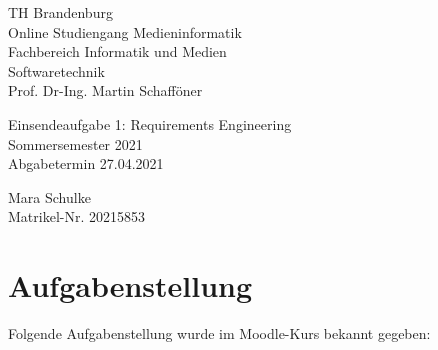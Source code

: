 \documentclass{article}
\begin{document}
\begin{titlepage}
	\begin{flushleft}
		TH Brandenburg \\
		Online Studiengang Medieninformatik \\
		Fachbereich Informatik und Medien \\
		Softwaretechnik \\
		Prof. Dr-Ing. Martin Schafföner
	\end{flushleft}

	\vfill

	\begin{center}
		\Large{Einsendeaufgabe 1: Requirements Engineering}\\[0.5em]
		\large{Sommersemester 2021}\\[0.25em]
		\large{Abgabetermin 27.04.2021}
	\end{center}

	\vfill

	\begin{flushright}
		Mara Schulke \\
		Matrikel-Nr. 20215853
	\end{flushright}
\end{titlepage}

\tableofcontents

\newpage

\section{Aufgabenstellung}

Folgende Aufgabenstellung wurde im Moodle-Kurs bekannt gegeben:
\end{document}
